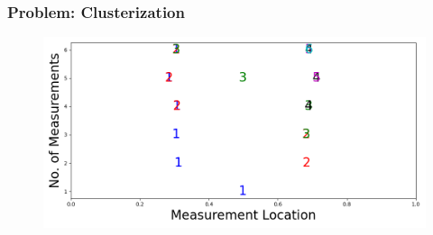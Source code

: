 \documentclass{beamer}
\begin{document}
  



\begin{frame}
\frametitle{Problem: Clusterization}
\begin{figure}
  \centering
  \includegraphics[height=0.5\textwidth]{figs/dst_modelError0.png}
\end{figure}

\end{frame}
\end{document}
